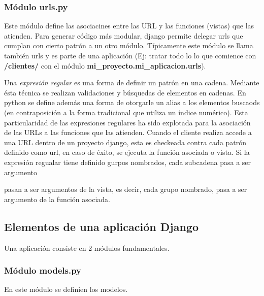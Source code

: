 \documentclass[a4paper]{report}
\begin{document}
\subsubsection*{Módulo urls.py}
  Este módulo define las asociacines entre las URL y las funciones (vistas) que las
atienden. Para generar código más modular, django permite delegar urls que cumplan
con cierto patrón a un otro módulo. Típicamente este módulo se llama también urls y 
es parte de una aplicación (Ej: tratar todo lo lo que comience con \textbf{/clientes/} con el módulo
\textbf{mi\_proyecto.mi\_aplicacion.urls}).

Una \emph{expresión regular} es una forma de definir un patrón en una cadena. Mediante
ésta técnica se realizan validaciones y búsquedas de elementos en cadenas. En python
se define además una forma de otorgarle un alias a los elementos buscaods (en contraposición
a la forma tradicional que utiliza un índice numérico).
Esta particularidad de las expresiones regulares ha sido explotada para la asociación
de las URLs a las funciones que las atienden.
Cuando el cliente realiza accede a una URL dentro de un proyecto django, esta es checkeada
contra cada patrón definido como url, en caso de éxito, se ejecuta la función asociada o vista.
Si la expresión regualar tiene definido gurpos nombrados, cada subcadena pasa a ser argumento

pasan a ser argumentos de la vista, es decir, cada grupo nombrado, pasa a ser argumento
de la función asociada.

\subsection*{Elementos de una aplicación Django}

Una aplicación consiste en 2 módulos fundamentales.
\subsubsection*{Módulo models.py}
En este módulo se definien los modelos.
\end{document}
